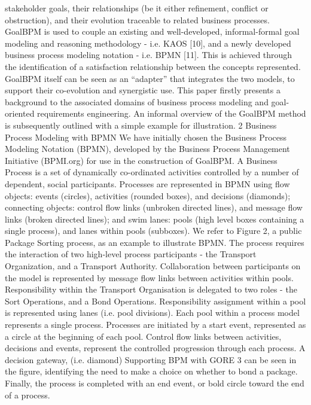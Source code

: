 stakeholder goals, their relationships (be it either refinement, conflict or obstruction), and their evolution traceable to related business processes. GoalBPM is
used to couple an existing and well-developed, informal-formal goal modeling and
reasoning methodology - i.e. KAOS [10], and a newly developed business process
modeling notation - i.e. BPMN [11]. This is achieved through the identification
of a satisfaction relationship between the concepts represented. GoalBPM itself
can be seen as an “adapter” that integrates the two models, to support their
co-evolution and synergistic use.
This paper firstly presents a background to the associated domains of business process modeling and goal-oriented requirements engineering. An informal
overview of the GoalBPM method is subsequently outlined with a simple example for illustration.
2 Business Process Modeling with BPMN
We have initially chosen the Business Process Modeling Notation (BPMN), developed by the Business Process Management Initiative (BPMI.org) for use in
the construction of GoalBPM.
A Business Process is a set of dynamically co-ordinated activities controlled
by a number of dependent, social participants. Processes are represented in
BPMN using flow objects: events (circles), activities (rounded boxes), and
decisions (diamonds); connecting objects: control flow links (unbroken directed lines), and message flow links (broken directed lines); and swim lanes:
pools (high level boxes containing a single process), and lanes within pools (subboxes).
We refer to Figure 2, a public Package Sorting process, as an example to
illustrate BPMN. The process requires the interaction of two high-level process
participants - the Transport Organization, and a Transport Authority. Collaboration between participants on the model is represented by message flow links
between activities within pools. Responsibility within the Transport Organisation is delegated to two roles - the Sort Operations, and a Bond Operations.
Responsibility assignment within a pool is represented using lanes (i.e. pool divisions). Each pool within a process model represents a single process. Processes
are initiated by a start event, represented as a circle at the beginning of each
pool. Control flow links between activities, decisions and events, represent the
controlled progression through each process. A decision gateway, (i.e. diamond)
Supporting BPM with GORE 3
can be seen in the figure, identifying the need to make a choice on whether to
bond a package. Finally, the process is completed with an end event, or bold
circle toward the end of a process.
